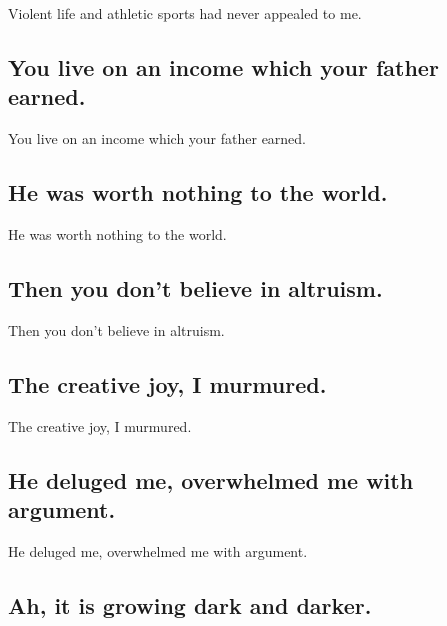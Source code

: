 \documentclass[]{article}
\begin{document}
Violent life and athletic sports had never appealed to me.

\hypertarget{you-live-on-an-income-which-your-father-earned.}{%
\subsection{You live on an income which your father
earned.}\label{you-live-on-an-income-which-your-father-earned.}}

You live on an income which your father earned.

\hypertarget{he-was-worth-nothing-to-the-world.}{%
\subsection{He was worth nothing to the
world.}\label{he-was-worth-nothing-to-the-world.}}

He was worth nothing to the world.

\hypertarget{then-you-dont-believe-in-altruism.}{%
\subsection{Then you don't believe in
altruism.}\label{then-you-dont-believe-in-altruism.}}

Then you don't believe in altruism.

\hypertarget{the-creative-joy-i-murmured.}{%
\subsection{The creative joy, I
murmured.}\label{the-creative-joy-i-murmured.}}

The creative joy, I murmured.

\hypertarget{he-deluged-me-overwhelmed-me-with-argument.}{%
\subsection{He deluged me, overwhelmed me with
argument.}\label{he-deluged-me-overwhelmed-me-with-argument.}}

He deluged me, overwhelmed me with argument.

\hypertarget{ah-it-is-growing-dark-and-darker.}{%
\subsection{Ah, it is growing dark and
darker.}\label{ah-it-is-growing-dark-and-darker.}}
\end{document}
